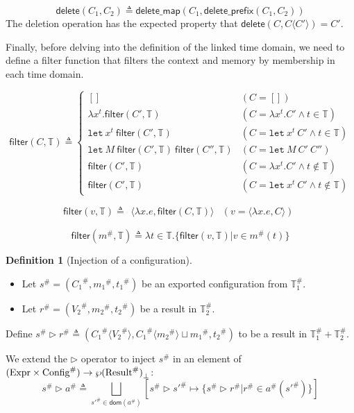 \documentclass{article}
\theoremstyle{definition}
\newtheorem{definition}{Definition}[section]
\newcommand*{\A}[1]{{#1}^{\#}}
\newcommand*{\Expr}{\text{Expr}}
\newcommand*{\Time}{\mathbb{T}}
\newcommand*{\ATime}{\A{\Time}}
\newcommand*{\mem}{m}
\newcommand*{\AConfig}[1]{\A{\text{Config}}\vphantom{#1}}
\newcommand*{\AResult}[1]{\A{\text{Result}}\vphantom{#1}}
\newcommand*{\inject}[2]{{#1}\langle{#2}\rangle}
\newcommand*{\deletepre}{\mathsf{delete\_prefix}}
\newcommand*{\deletemap}{\mathsf{delete\_map}}
\newcommand*{\delete}{\mathsf{delete}}
\newcommand*{\filter}{\mathsf{filter}}
\newcommand*{\Let}{\mathtt{let}}
\begin{document}
\[
  \delete(C_{1},C_{2})\triangleq \deletemap(C_{1},\deletepre(C_{1},C_{2}))
\]
The deletion operation has the expected property that $\delete(C,\inject{C}{C'})=C'$.

Finally, before delving into the definition of the linked time domain, we need to define a filter function that filters the context and memory by membership in each time domain.

\[
  \filter(C,\Time)\triangleq
  \begin{cases}
    []                                             & (C=[])                                   \\
    \lambda x^{t}.\filter(C',\Time)                & (C=\lambda x^{t}.C'\wedge t\in\Time)     \\
    \Let\:x^{t}\:\filter(C',\Time)                 & (C=\Let\:x^{t}\:C'\wedge t\in\Time)      \\
    \Let\:M\:\filter(C',\Time)\:\filter(C'',\Time) & (C=\Let\:M\:C'\:C'')                     \\
    \filter(C',\Time)                              & (C=\lambda x^{t}.C'\wedge t\not\in\Time) \\
    \filter(C',\Time)                              & (C=\Let\:x^{t}\:C'\wedge t\not\in\Time)
  \end{cases}
\]

\[
  \filter(v,\Time)\triangleq
  \begin{array}{ll}
    \langle\lambda x.e,\filter(C,\Time)\rangle & (v=\langle\lambda x.e,C\rangle)
  \end{array}
\]

\[
  \filter(\A\mem,\Time)\triangleq
  \lambda t\in\Time.\{\filter(v,\Time)|v\in\A{m}(t)\}
\]

\begin{definition}[Injection of a configuration]
  $\:$

  \begin{itemize}
    \item Let $\A{s}=(\A{C_1},\A{\mem_1},\A{t_1})$ be an exported configuration from $\ATime_1$.
    \item Let $\A{r}=(\A{V_2},\A{\mem_2},\A{t_2})$ be a result in $\ATime_2$.
  \end{itemize}

  Define $\A{s}\rhd\A{r}\triangleq(\A{C_1}\langle\A{V_2}\rangle,\A{C_1}\langle\A{\mem_2}\rangle\sqcup\A{\mem_1},\A{t_2})$ to be a result in $\ATime_1+\ATime_2$.

  We extend the $\rhd$ operator to inject $\A{s}$ in an element of $(\Expr\times\AConfig{\ATime})\rightarrow{\wp(\AResult{\ATime})}_{\bot}$:
  \[
    \A{s}\rhd\A{a}\triangleq\bigsqcup_{\A{s'}\in\mathsf{dom}(\A{a})}[\A{s}\rhd\A{s'}\mapsto\{\A{s}\rhd\A{r}|\A{r}\in\A{a}(\A{s'})\}]
  \]
\end{definition}
\end{document}

